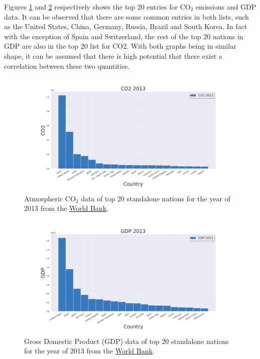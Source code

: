 \documentclass[11pt,a4paper,titlepage]{article}
\newcommand{\blankline}{\quad\pagebreak[2]}
\begin{document}
\blankline

Figures \ref{fig:CO22013} and \ref{fig:GDP2013} respectively shows the top 20 entries for CO$_{2}$ emissions and GDP data. It can be observed that there are some common entries in both lists, such as the United States, China, Germany, Russia, Brazil and South Korea. In fact with the exception of Spain and Switzerland, the rest of the top 20 nations in GDP are also in the top 20 list for CO2. With both graphs being in similar shape, it can be assumed that there is high potential that there exist a correlation between these two quantities.

\begin{figure}[!htbp]
    \begin{center}
        \includegraphics[width=\textwidth]{../Plots/CO2_2013.png}
        \caption{Atmospheric CO$_{2}$ data of top 20 standalone nations for the year of 2013 from the \href{https://www.worldbank.org/}{World Bank}.}
        \label{fig:CO22013}
    \end{center}
\end{figure}

\begin{figure}[!htbp]
    \begin{center}
        \includegraphics[width=\textwidth]{../Plots/GDP_2013.png}
        \caption{Gross Domestic Product (GDP) data of top 20 standalone nations for the year of 2013 from the \href{https://www.worldbank.org/}{World Bank}.}
        \label{fig:GDP2013}
    \end{center}
\end{figure}
\end{document}
